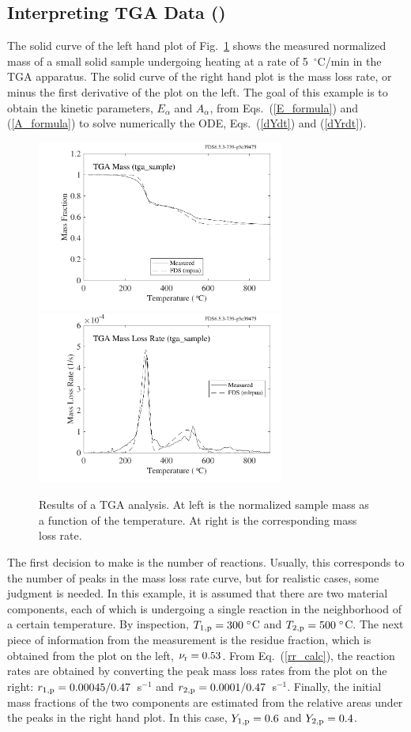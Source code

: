 \documentclass[11pt]{book}
\begin{document}
\subsection{Interpreting TGA Data (\texorpdfstring{}{tga\_sample})}
\label{tga_sample}

The solid curve of the left hand plot of Fig.~\ref{tga_sample_plot} shows the measured normalized mass of a small solid sample undergoing heating at a rate of 5~$^\circ$C/min in the TGA apparatus. The solid curve of the right hand plot is the mass loss rate, or minus the first derivative of the plot on the left. The goal of this example is to obtain the kinetic parameters, $E_\alpha$ and $A_\alpha$, from Eqs.~(\ref{E_formula}) and (\ref{A_formula}) to solve numerically the ODE, Eqs.~(\ref{dYdt}) and (\ref{dYrdt}).
\begin{figure}[!htb]
\includegraphics[width=3.2in]{SCRIPT_FIGURES/tga_sample_mass}
\includegraphics[width=3.2in]{SCRIPT_FIGURES/tga_sample_mlr}
\caption[Results of a TGA analysis]{Results of a TGA analysis. At left is the normalized sample mass as a function of the temperature. At right is the corresponding mass loss rate.}
\label{tga_sample_plot}
\end{figure}
The first decision to make is the number of reactions. Usually, this corresponds to the number of peaks in the mass loss rate curve, but for realistic cases, some judgment is needed. In this example, it is assumed that there are two material components, each of which is undergoing a single reaction in the neighborhood of a certain temperature. By inspection, $T_{1,{\rm p}}=300 \; ^\circ$C and $T_{2,{\rm p}}=500 \; ^\circ$C. The next piece of information from the measurement is the residue fraction, which is obtained from the plot on the left, $\nu_{\rm r}=0.53$. From Eq.~(\ref{rr_calc}), the reaction rates are obtained by converting the peak mass loss rates from the plot on the right: $r_{1,{\rm p}}=0.00045/0.47$~s$^{-1}$ and $r_{2,{\rm p}}=0.0001/0.47$~s$^{-1}$.  Finally, the initial mass fractions of the two components are estimated from the relative areas under the peaks in the right hand plot. In this case, $Y_{1,{\rm p}}=0.6$ and $Y_{2,{\rm p}}=0.4$.
\end{document}
